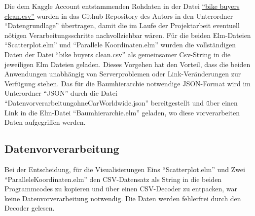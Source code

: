 \documentclass[usegeometry=true]{scrartcl}
\begin{document}
Die dem Kaggle Account \cite{Dedhia.22.09.2020} entstammenden Rohdaten in der Datei \href{https://github.com/floeagle/Bike-Buyers-1000/blob/main/Daten-zum-Laden/Datengrundlage/bike_buyers_clean.csv}{"`bike buyers clean.csv"'} wurden in das Github Repository des Autors in den Unterordner "`Datengrundlage"' übertragen, damit die im Laufe der Projektarbeit eventuell nötigen Verarbeitungsschritte nachvollziehbar wären. Für die beiden Elm-Dateien "`Scatterplot.elm"' und "`Parallele Koordinaten.elm"' wurden die vollständigen Daten der Datei "`bike buyers clean.csv"' als gemeinsamer Csv-String in die jeweiligen Elm Dateien geladen. Dieses Vorgehen hat den Vorteil, dass die beiden Anwendungen unabhängig von Serverproblemen oder Link-Veränderungen zur Verfügung stehen. Das für die Baumhierarchie notwendige JSON-Format wird im Unterordner "`JSON"' durch die Datei "`DatenvorverarbeitungohneCarWorldwide.json"' bereitgestellt und über einen Link in die  Elm-Datei "`Baumhierarchie.elm"' geladen, wo diese vorverarbeiten Daten aufgegriffen werden. 


\subsection{Datenvorverarbeitung}
Bei der Entscheidung, für die Visualisierungen Eins "`Scatterplot.elm"' und Zwei "`ParalleleKoordinaten.elm"' den CSV-Datensatz als String in die beiden Programmcodes zu kopieren und über einen CSV-Decoder zu entpacken, war keine Datenvorverarbeitung notwendig. Die Daten werden fehlerfrei durch den Decoder gelesen.
\end{document}
